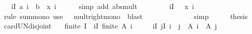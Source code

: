 \begin{isabellebody}
\ {\isachardoublequoteopen}{\isasymdots}\ {\isasymle}\ {\isacharparenleft}{\kern0pt}{\isasymSum}i{\isasymin}I{\isachardot}{\kern0pt}\ {\isasymbar}{\isacharparenleft}{\kern0pt}a\ i\ {\isacharminus}{\kern0pt}\ b{\isacharparenright}{\kern0pt}{\isasymbar}\ {\isacharasterisk}{\kern0pt}\ x\ i{\isacharparenright}{\kern0pt}{\isachardoublequoteclose}\isanewline
\ \ \ \ \isamarkupfalse%
\ {\isacharparenleft}{\kern0pt}simp\ add{\isacharcolon}{\kern0pt}\ abs{\isacharunderscore}{\kern0pt}mult\ {}{\isacharparenright}{\kern0pt}\isanewline
\ \ \isamarkupfalse%
\ \isamarkupfalse%
\ {\isachardoublequoteopen}{\isasymdots}\ {\isasymle}\ {\isacharparenleft}{\kern0pt}{\isasymSum}i{\isasymin}I{\isachardot}{\kern0pt}\ {\isasymdelta}\ {\isacharasterisk}{\kern0pt}\ x\ i{\isacharparenright}{\kern0pt}{\isachardoublequoteclose}\isanewline
\ \ \ \ \isamarkupfalse%
\ {\isacharparenleft}{\kern0pt}rule\ sum{\isacharunderscore}{\kern0pt}mono{\isacharparenright}{\kern0pt}\ {\isacharparenleft}{\kern0pt}use\ {\isasymdelta}\ {\isachardoublequoteopen}{}{\isachardoublequoteclose}\ mult{\isacharunderscore}{\kern0pt}right{\isacharunderscore}{\kern0pt}mono\ \ blast{\isacharparenright}{\kern0pt}\isanewline
\ \ \isamarkupfalse%
\ \isamarkupfalse%
\ {\isachardoublequoteopen}{\isasymdots}\ {\isacharequal}{\kern0pt}\ {\isasymdelta}{\isachardoublequoteclose}\isanewline
\ \ \ \ \isamarkupfalse%
\ simp\isanewline
\ \ \isamarkupfalse%
\ \isamarkupfalse%
\ {\isacharquery}{\kern0pt}thesis\ \isacommand{{\isachardot}{\kern0pt}}\isamarkupfalse%
\isanewline
{}\isamarkupfalse%
%
\endisatagproof
{\isafoldproof}%
%
\isadelimproof
\isanewline
%
\endisadelimproof
\isanewline
{}\isamarkupfalse%
\ card{\isacharunderscore}{\kern0pt}UN{\isacharunderscore}{\kern0pt}disjoint{\isacharcolon}{\kern0pt}\isanewline
\ \ \ {\isachardoublequoteopen}finite\ I{\isachardoublequoteclose}\ \ {\isachardoublequoteopen}{\isasymforall}i{\isasymin}I{\isachardot}{\kern0pt}\ finite\ {\isacharparenleft}{\kern0pt}A\ i{\isacharparenright}{\kern0pt}{\isachardoublequoteclose}\isanewline
\ \ \ \ \ {\isachardoublequoteopen}{\isasymforall}i{\isasymin}I{\isachardot}{\kern0pt}\ {\isasymforall}j{\isasymin}I{\isachardot}{\kern0pt}\ i\ {\isasymnoteq}\ j\ {\isasymlongrightarrow}\ A\ i\ {\isasyminter}\ A\ j\ {\isacharequal}{\kern0pt}\ {\isacharbraceleft}{\kern0pt}{\isacharbraceright}{\kern0pt}{\isachardoublequoteclose}\isanewline

\end{isabellebody}
